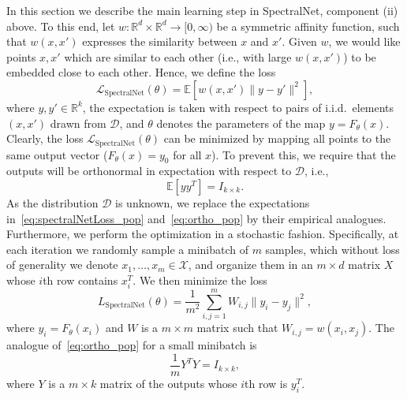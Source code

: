 \documentclass{article} %
\begin{document}
In this section we describe the main learning step in SpectralNet, component (ii) above.
To this end, let \mbox{$w:\mathbb{R}^d\times\mathbb{R}^d \rightarrow [0,\infty)$} be a symmetric affinity function, such that $w(x,x')$ expresses the similarity between $x$ and $x'$.
Given $w$, we would like points $x,x'$ which are similar to each other (i.e., with large $w(x,x')$) to be embedded close to each other. Hence, we define the loss
\begin{equation}
\mathcal{L}_\text{SpectralNet}(\theta) = \mathbb{E}\left[w({x,x'})\|y-y'\|^2\right],
\label{eq:spectralNetLoss_pop}
\end{equation}
where \(y,y' \in \mathbb{R}^k\), the expectation is taken with respect to  pairs of i.i.d.\ elements $(x,x')$ drawn from $\mathcal{D}$, and  $\theta$ denotes the parameters of the map \(y=F_{\theta}(x).\)  Clearly, the loss $\mathcal{L}_\text{SpectralNet}(\theta)$ can be minimized by mapping all points to the same output vector ($F_\theta(x) = y_0$ for all $x$).
To prevent this, we require that the outputs will be orthonormal in expectation with respect to $\mathcal{D}$, i.e.,
\begin{equation}
\mathbb{E}\left[yy^T \right]=I_{k\times k}.
\label{eq:ortho_pop}
\end{equation}
As the distribution $\mathcal{D}$ is unknown, we replace the expectations in~\eqref{eq:spectralNetLoss_pop} and~\eqref{eq:ortho_pop} by their empirical analogues.
Furthermore, we perform the optimization in a stochastic fashion.
Specifically, at each iteration we randomly sample a  minibatch of $m$ samples, which without loss of generality we denote $x_1,\ldots,x_m \in \mathcal{X}$, and organize them in an $m \times d$ matrix $X$ whose $i$th row contains $x_i^T$. We then minimize the loss
\begin{equation}
L_\text{SpectralNet}(\theta) = \frac{1}{m^2}\sum_{i,j=1}^m W_{i,j}\|y_i-y_j\|^2,
\label{eq:spectralNetLoss}
\end{equation}
where $y_i=F_\theta(x_i)$ and $W$ is a $m \times m$ matrix such that $W_{i,j} = w(x_i,x_j)$.
The analogue of~\eqref{eq:ortho_pop} for a small minibatch is
\begin{equation}
\frac{1}{m}Y^TY = I_{k\times k},
\label{eq:ortho}
\end{equation}
where $Y$ is a $m\times k$ matrix of the outputs whose $i$th row is $y_i^T$.
\end{document}
